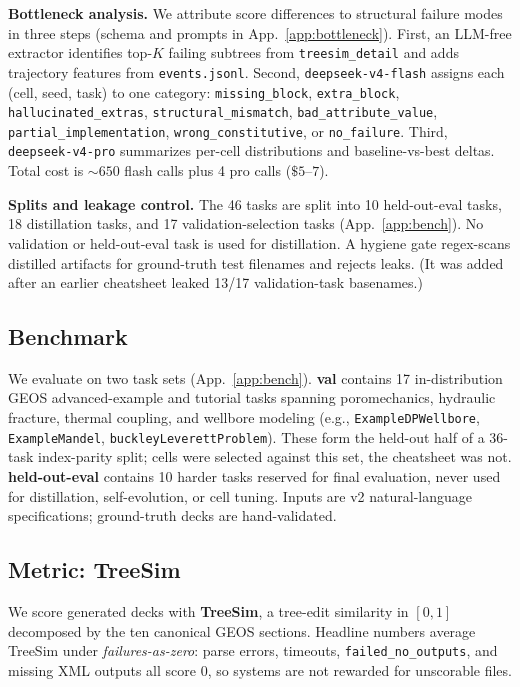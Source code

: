 \documentclass{article}
\begin{document}
\textbf{Bottleneck analysis.} We attribute score differences to structural failure modes in three steps (schema and prompts in App.~\ref{app:bottleneck}). First, an LLM-free extractor identifies top-$K$ failing subtrees from \texttt{treesim\_detail} and adds trajectory features from \texttt{events.jsonl}. Second, \texttt{deepseek-v4-flash} assigns each (cell, seed, task) to one category: \texttt{missing\_block}, \texttt{extra\_block}, \texttt{hallucinated\_extras}, \texttt{structural\_mismatch}, \texttt{bad\_attribute\_value}, \texttt{partial\_implementation}, \texttt{wrong\_constitutive}, or \texttt{no\_failure}. Third, \texttt{deepseek-v4-pro} summarizes per-cell distributions and baseline-vs-best deltas. Total cost is ${\sim}650$ flash calls plus 4 pro calls ($\$5\text{--}7$).

\textbf{Splits and leakage control.} The 46 tasks are split into 10 held-out-eval tasks, 18 distillation tasks, and 17 validation-selection tasks (App.~\ref{app:bench}). No validation or held-out-eval task is used for distillation. A hygiene gate regex-scans distilled artifacts for ground-truth test filenames and rejects leaks. (It was added after an earlier cheatsheet leaked 13/17 validation-task basenames.)

\subsection{Benchmark}
\label{subsec:benchmark}
We evaluate on two task sets (App.~\ref{app:bench}). \textbf{val} contains 17 in-distribution GEOS advanced-example and tutorial tasks spanning poromechanics, hydraulic fracture, thermal coupling, and wellbore modeling (e.g., \texttt{ExampleDPWellbore}, \texttt{ExampleMandel}, \texttt{buckleyLeverettProblem}). These form the held-out half of a 36-task index-parity split; cells were selected against this set, the cheatsheet was not. \textbf{held-out-eval} contains 10 harder tasks reserved for final evaluation, never used for distillation, self-evolution, or cell tuning. Inputs are v2 natural-language specifications; ground-truth decks are hand-validated.

\subsection{Metric: TreeSim}
\label{subsec:metric}
We score generated decks with \textbf{TreeSim}, a tree-edit similarity in $[0,1]$ decomposed by the ten canonical GEOS sections. Headline numbers average TreeSim under \emph{failures-as-zero}: parse errors, timeouts, \texttt{failed\_no\_outputs}, and missing XML outputs all score 0, so systems are not rewarded for unscorable files.
\end{document}
